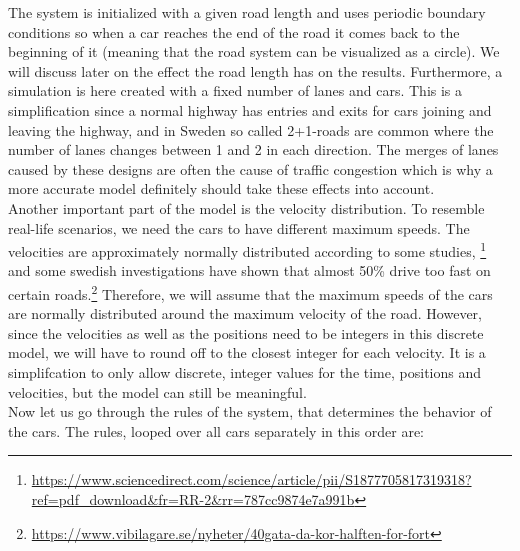 \documentclass[a4paper,12pt]{article}
\begin{document}
The system is initialized with a given road length and uses periodic boundary conditions so when a car reaches the end of the road it comes back to the beginning of it (meaning that the road system can be visualized as a circle). We will discuss later on the effect the road length has on the results. Furthermore, a simulation is here created with a fixed number of lanes and cars. This is a simplification since a normal highway has entries and exits for cars joining and leaving the highway, and in Sweden so called 2+1-roads are common where the number of lanes changes between 1 and 2 in each direction. The merges of lanes caused by these designs are often the cause of traffic congestion which is why a more accurate model definitely should take these effects into account.\\ 

Another important part of the model is the velocity distribution. To resemble real-life scenarios, we need the cars to have different maximum speeds. The velocities are approximately normally distributed according to some studies, \footnote{\url{https://www.sciencedirect.com/science/article/pii/S1877705817319318?ref=pdf_download&fr=RR-2&rr=787cc9874e7a991b}} and some swedish investigations have shown that almost 50\% drive too fast on certain roads.\footnote{\url{https://www.vibilagare.se/nyheter/40gata-da-kor-halften-for-fort}} Therefore, we will assume that the maximum speeds of the cars are normally distributed around the maximum velocity of the road. However, since the velocities as well as the positions need to be integers in this discrete model, we will have to round off to the closest integer for each velocity. It is a simplifcation to only allow discrete, integer values for the time, positions and velocities, but the model can still be meaningful.\\ 

Now let us go through the rules of the system, that determines the behavior of the cars. The rules, looped over all cars separately in this order are:
\end{document}
